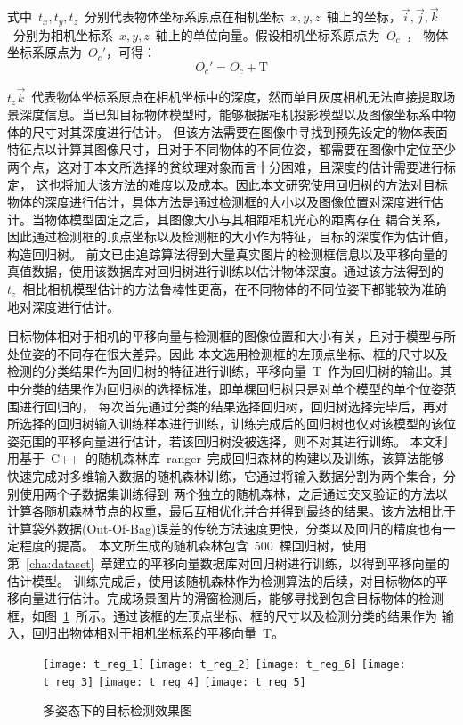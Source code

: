 式中~$t_x, t_y, t_z$~分别代表物体坐标系原点在相机坐标~$x,y,z$~轴上的坐标，$\vec{i},\vec{j},\vec{k}$~分别为相机坐标系~$x,y,z$~轴上的单位向量。假设相机坐标系原点为~$O_c$~，
物体坐标系原点为~$O_c'$，可得：
\begin{equation}
  \label{equ:chap4:point_T}
O_c' = O_c + \textrm{T}
\end{equation}

$t_z\vec{k}$~代表物体坐标系原点在相机坐标中的深度，然而单目灰度相机无法直接提取场景深度信息。当已知目标物体模型时，能够根据相机投影模型以及图像坐标系中物体的尺寸对其深度进行估计。
但该方法需要在图像中寻找到预先设定的物体表面特征点以计算其图像尺寸，且对于不同物体的不同位姿，都需要在图像中定位至少两个点，这对于本文所选择的贫纹理对象而言十分困难，且深度的估计需要进行标定，
这也将加大该方法的难度以及成本。因此本文研究使用回归树的方法对目标物体的深度进行估计，具体方法是通过检测框的大小以及图像位置对深度进行估计。当物体模型固定之后，其图像大小与其相距相机光心的距离存在
耦合关系，因此通过检测框的顶点坐标以及检测框的大小作为特征，目标的深度作为估计值，构造回归树。
前文已由追踪算法得到大量真实图片的检测框信息以及平移向量的真值数据，使用该数据库对回归树进行训练以估计物体深度。通过该方法得到的~$t_z$~相比相机模型估计的方法鲁棒性更高，在不同物体的不同位姿下都能较为准确地对深度进行估计。

目标物体相对于相机的平移向量与检测框的图像位置和大小有关，且对于模型与所处位姿的不同存在很大差异。因此
本文选用检测框的左顶点坐标、框的尺寸以及检测的分类结果作为回归树的特征进行训练，平移向量~$\textrm{T}$~作为回归树的输出。其中分类的结果作为回归树的选择标准，即单棵回归树只是对单个模型的单个位姿范围进行回归的，
每次首先通过分类的结果选择回归树，回归树选择完毕后，再对所选择的回归树输入训练样本进行训练，训练完成后的回归树也仅对该模型的该位姿范围的平移向量进行估计，若该回归树没被选择，则不对其进行训练。
本文利用基于~C++~的随机森林库~ranger\cite{WrightRangerFastImplementation2017}~完成回归森林的构建以及训练，该算法能够快速完成对多维输入数据的随机森林训练，它通过将输入数据分割为两个集合，分别使用两个子数据集训练得到
两个独立的随机森林，之后通过交叉验证的方法以计算各随机森林节点的权重，最后互相优化并合并得到最终的结果。该方法相比于计算袋外数据(Out-Of-Bag)误差的传统方法速度更快，分类以及回归的精度也有一定程度的提高。
本文所生成的随机森林包含~500~棵回归树，使用第~\ref{cha:dataset}~章建立的平移向量数据库对回归树进行训练，以得到平移向量的估计模型。
训练完成后，使用该随机森林作为检测算法的后续，对目标物体的平移向量进行估计。完成场景图片的滑窗检测后，能够寻找到包含目标物体的检测框，如图~\ref{fig:chap04:mul_pose_detect_result}~所示。通过该框的左顶点坐标、框的尺寸以及检测分类的结果作为
输入，回归出物体相对于相机坐标系的平移向量~$\textrm{T}$。
\begin{figure}[t] %
  \centering%
    \texttt{[image: t\_reg\_1]}
    \texttt{[image: t\_reg\_2]}
    \texttt{[image: t\_reg\_6]}
    \quad
    \texttt{[image: t\_reg\_3]}
    \texttt{[image: t\_reg\_4]}
    \texttt{[image: t\_reg\_5]}
  \caption{多姿态下的目标检测效果图}
    \label{fig:chap04:mul_pose_detect_result}
\end{figure}

